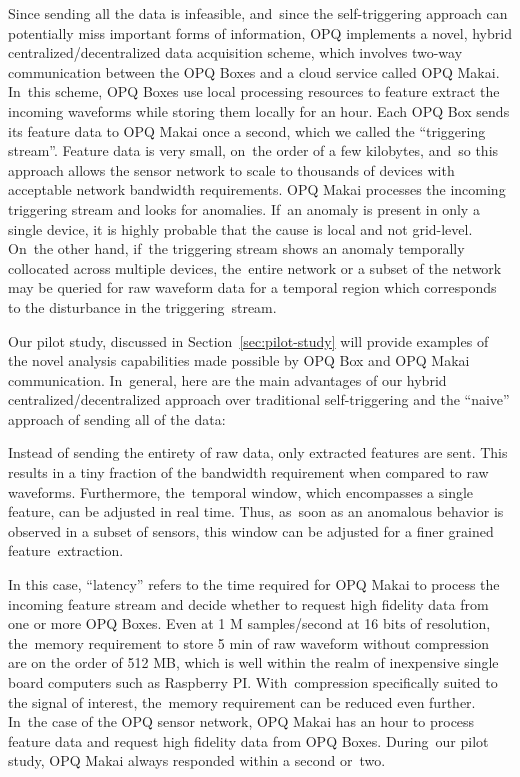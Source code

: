 \documentclass[energies,article,accept,moreauthors,pdftex]{Definitions/mdpi}
\begin{document}
Since sending all the data is infeasible, and~since the self-triggering approach can potentially miss important forms of information, OPQ implements a novel, hybrid centralized/decentralized data acquisition scheme, which involves two-way communication between the OPQ Boxes and a cloud service called OPQ Makai. In~this scheme, OPQ Boxes use local processing resources to feature extract the incoming waveforms while storing them locally for an hour. Each OPQ Box sends its feature data to OPQ Makai once a second, which we called the ``triggering stream''. Feature data is very small, on~the order of a few kilobytes, and~so this approach allows the sensor network to scale to thousands of devices with acceptable network bandwidth requirements. OPQ Makai processes the incoming triggering stream and looks for anomalies. If~an anomaly is present in only a single device, it is highly probable that the cause is local and not grid-level. On~the other hand, if~the triggering stream shows an anomaly temporally collocated across multiple devices, the~entire network or a subset of the network may be queried for raw waveform data for a temporal region which corresponds to the disturbance in the triggering~stream.

Our pilot study, discussed in Section~\ref{sec:pilot-study} will provide examples of the novel analysis capabilities made possible by OPQ Box and OPQ Makai communication. In~general, here are the main advantages of our hybrid centralized/decentralized approach over traditional self-triggering and the ``naive'' approach of sending all of the data:

 Instead of sending the entirety of raw data, only extracted features are sent. This results in a tiny fraction of the bandwidth requirement when compared to raw waveforms. Furthermore, the~temporal window, which encompasses a single feature, can be adjusted in real time. Thus, as~soon as an anomalous behavior is observed in a subset of sensors, this window can be adjusted for a finer grained feature~extraction.

 In this case, ``latency'' refers to the time required for OPQ Makai to process the incoming feature stream and decide whether to request high fidelity data from one or more OPQ Boxes. Even at 1 M samples/second at 16 bits of resolution, the~memory requirement to store 5 min of raw waveform without compression are on the order of 512 MB, which is well within the realm of inexpensive single board computers such as Raspberry PI. With~compression specifically suited to the signal of interest, the~memory requirement can be reduced even further. In~the case of the OPQ sensor network, OPQ Makai has an hour to process feature data and request high fidelity data from OPQ Boxes. During~our pilot study, OPQ Makai always responded within a second or~two.
\end{document}
